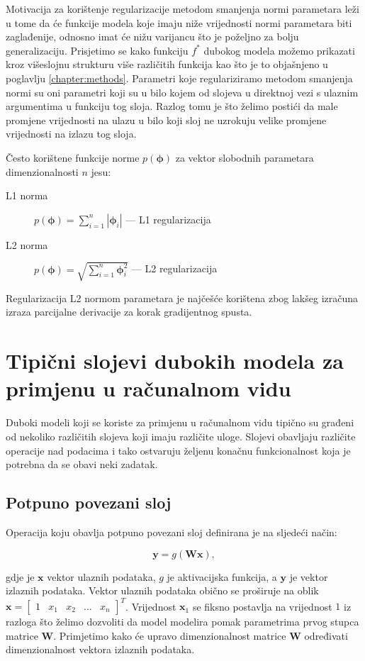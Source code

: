\documentclass[times, utf8, diplomski, numeric]{fer}
\begin{document}
Motivacija za korištenje regularizacije metodom smanjenja normi parametara leži u tome da će funkcije modela koje imaju niže vrijednosti normi parametara biti zaglađenije, odnosno imat će nižu varijancu što je poželjno za bolju generalizaciju.
Prisjetimo se kako funkciju $f^*$ dubokog modela možemo prikazati kroz višeslojnu strukturu više različitih funkcija kao što je to objašnjeno u poglavlju \ref{chapter:methods}.
Parametri koje regulariziramo metodom smanjenja normi su oni parametri koji su u bilo kojem od slojeva u direktnoj vezi s ulaznim argumentima u funkciju tog sloja.
Razlog tomu je što želimo postići da male promjene vrijednosti na ulazu u bilo koji sloj ne uzrokuju velike promjene vrijednosti na izlazu tog sloja.

Često korištene funkcije norme $p(\boldsymbol{\phi})$ za vektor slobodnih parametara dimenzionalnosti $n$ jesu:
\begin{description}
 \item [L1 norma] $p(\boldsymbol{\phi})=\sum_{i=1}^n \left| \boldsymbol{\phi}_i \right|$ --- L1  regularizacija
 \item [L2 norma] $p(\boldsymbol{\phi})=\sqrt{\sum_{i=1}^n  \boldsymbol{\phi}_i^2 }$ --- L2  regularizacija
\end{description}
Regularizacija L2 normom parametara je najčešće korištena zbog lakšeg izračuna izraza parcijalne derivacije za korak gradijentnog spusta.

\section{Tipični slojevi dubokih modela za primjenu u računalnom vidu}
Duboki modeli koji se koriste za primjenu u računalnom vidu tipično su građeni od nekoliko različitih slojeva koji imaju različite uloge.
Slojevi obavljaju različite operacije nad podacima i tako ostvaruju željenu konačnu funkcionalnost koja je potrebna da se obavi neki zadatak.

\subsection{Potpuno povezani sloj}
Operacija koju obavlja potpuno povezani sloj definirana je na sljedeći način:

\begin{equation}
 \mathbf{y}=g(\mathbf{W}\mathbf{x}),
\end{equation}

\noindent gdje je $\mathbf{x}$ vektor ulaznih podataka, $g$ je aktivacijska funkcija, a  $\mathbf{y}$ je vektor izlaznih podataka. 
Vektor ulaznih podataka obično se proširuje na oblik $\mathbf{x} = \begin{bmatrix} 1 & x_1 & x_2 & ... & x_n \end{bmatrix}^T$.
Vrijednost $\mathbf{x}_1$ se fiksno postavlja na vrijednost $1$ iz razloga što želimo dozvoliti da model modelira pomak parametrima prvog stupca matrice $\mathbf{W}$.
Primjetimo kako će upravo dimenzionalnost matrice $\mathbf{W}$ određivati dimenzionalnost vektora izlaznih podataka.
\end{document}
